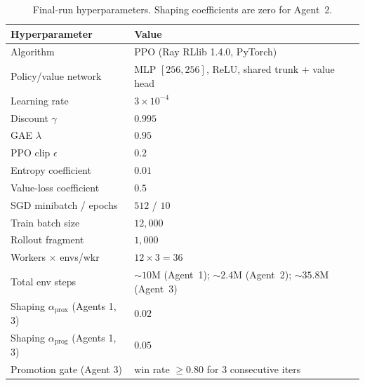 \documentclass{article}
\begin{document}
\begin{table}[h]
\centering
\small
\begin{tabular}{ll}
\toprule
Hyperparameter & Value \\
\midrule
Algorithm                  & PPO (Ray RLlib 1.4.0, PyTorch) \\
Policy/value network       & MLP $[256,256]$, ReLU, shared trunk + value head \\
Learning rate              & $3\times 10^{-4}$ \\
Discount $\gamma$          & $0.995$ \\
GAE $\lambda$              & $0.95$ \\
PPO clip $\epsilon$        & $0.2$ \\
Entropy coefficient        & $0.01$ \\
Value-loss coefficient     & $0.5$ \\
SGD minibatch / epochs     & $512$ / $10$ \\
Train batch size           & $12{,}000$ \\
Rollout fragment           & $1{,}000$ \\
Workers $\times$ envs/wkr  & $12\times3=36$ \\
Total env steps            & $\sim$$10$M (Agent~1); $\sim$$2.4$M (Agent~2); $\sim$$35.8$M (Agent~3) \\
\midrule
Shaping $\alpha_{\text{prox}}$ (Agents 1, 3) & $0.02$ \\
Shaping $\alpha_{\text{prog}}$ (Agents 1, 3) & $0.05$ \\
Promotion gate (Agent 3)   & win rate $\ge 0.80$ for $3$ consecutive iters \\
\bottomrule
\end{tabular}
\caption{Final-run hyperparameters. Shaping coefficients are zero for Agent~2.}
\label{tab:hp}
\end{table}
\end{document}
